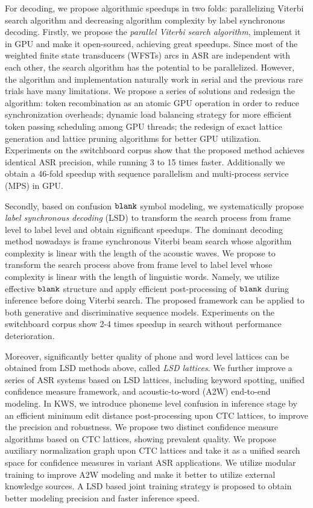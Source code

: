 \begin{englishabstract}
For decoding, we propose algorithmic speedups in two folds: parallelizing Viterbi search algorithm and decreasing algorithm complexity by label synchronous decoding. Firstly, we propose the {\em parallel Viterbi search algorithm}, implement it in GPU and make it open-sourced, achieving great speedups. Since most of the weighted finite state transducers (WFSTs) arcs in ASR are independent with each other, the search algorithm has the potential to be parallelized. However, the algorithm and implementation naturally work in serial and the previous rare trials have many limitations. We propose a series of solutions and redesign the algorithm:  token recombination as an atomic GPU operation in order to reduce synchronization overheads; dynamic load balancing strategy for more efficient token passing scheduling among GPU threads; the redesign of exact lattice
generation and lattice pruning algorithms for better GPU utilization. Experiments on the switchboard corpus show that the proposed method achieves identical ASR precision, while running 3 to 15 times faster. Additionally we obtain a 46-fold speedup with sequence parallelism and multi-process service (MPS) in GPU.

Secondly, based on confusion $\tt blank$ symbol modeling, we systematically propose {\em label synchronous decoding} (LSD) to transform the search process from frame level to label level and obtain significant speedups. The dominant decoding method nowadays is frame synchronous Viterbi beam search whose algorithm complexity is linear with the length of the acoustic waves. We propose  to transform the search process above from frame level to label level whose complexity is linear with the length of linguistic words. Namely, we utilize effective $\tt blank$ structure and apply efficient post-processing of $\tt blank$ during inference before doing Viterbi search. The proposed framework can be applied to both generative and discriminative sequence models. Experiments on the switchboard corpus show 2-4 times speedup in search without performance deterioration.

Moreover, significantly better quality of phone and word level lattices can be obtained from LSD methods above, called {\em LSD lattices}. We further improve a series of ASR systems based on LSD lattices, including keyword spotting, unified confidence measure framework, and acoustic-to-word (A2W) end-to-end modeling. In KWS, we introduce phoneme level confusion in inference stage by an efficient minimum edit distance  post-processing upon CTC lattices, to improve the precision and robustness. We propose two distinct confidence measure algorithms based on CTC lattices, showing prevalent quality. We propose auxiliary normalization graph upon CTC lattices  and take it as a unified search space for confidence measures in variant ASR applications. We utilize modular training to improve A2W modeling and make it better to utilize external knowledge sources. A LSD based joint training strategy is proposed to obtain better modeling precision and faster inference speed.


\end{englishabstract}
